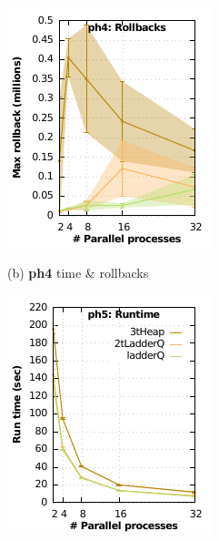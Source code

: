 \begin{figure}
\begin{minipage}{0.32\linewidth}
\begin{minipage}{0.49\linewidth}
\includegraphics[width=\linewidth]{images/ph4_Delay_1_Evt_2_rollbacks}
\end{minipage}
\centerline{(b) \textbf{ph4} time \& rollbacks}    
\end{minipage}
\begin{minipage}{0.32\linewidth}
\begin{minipage}{0.49\linewidth}
\includegraphics[width=\linewidth]{images/ph5_Delay_1_Evt_2_run_time}

\end{minipage}
\end{minipage}
\end{figure}
